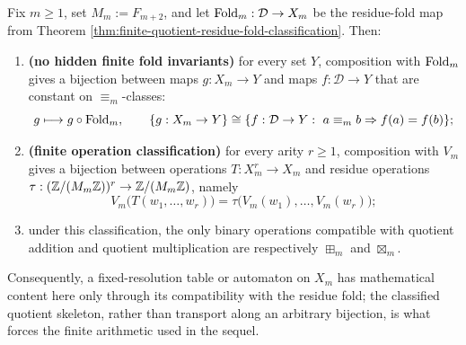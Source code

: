 \begin{theorem}\label{thm:residue-fold-factorization-rigidity}
Fix \(m\ge1\), set \(M_m:=F_{m+2}\), and let \(\operatorname{Fold}_m:\mathcal D\to X_m\) be the residue-fold map from Theorem \ref{thm:finite-quotient-residue-fold-classification}. Then:
\begin{enumerate}
  \item \textbf{(no hidden finite fold invariants)} for every set \(Y\), composition with \(\operatorname{Fold}_m\) gives a bijection between maps \(g:X_m\to Y\) and maps \(f:\mathcal D\to Y\) that are constant on \(\equiv_m\)-classes:
\[
g\longmapsto g\circ\operatorname{Fold}_m,
\qquad
\{g:X_m\to Y\}\cong\{f:\mathcal D\to Y:\ a\equiv_m b\Rightarrow f(a)=f(b)\};
\]
  \item \textbf{(finite operation classification)} for every arity \(r\ge1\), composition with \(V_m\) gives a bijection between operations \(T:X_m^r\to X_m\) and residue operations \(\tau:(\mathbb{Z}/(M_m\mathbb{Z}))^r\to\mathbb{Z}/(M_m\mathbb{Z})\), namely
\[
V_m\bigl(T(w_1,\dots,w_r)\bigr)
=\tau\bigl(V_m(w_1),\dots,V_m(w_r)\bigr);
\]
  \item under this classification, the only binary operations compatible with quotient addition and quotient multiplication are respectively \(\boxplus_m\) and \(\boxtimes_m\).
\end{enumerate}
Consequently, a fixed-resolution table or automaton on \(X_m\) has mathematical content here only through its compatibility with the residue fold; the classified quotient skeleton, rather than transport along an arbitrary bijection, is what forces the finite arithmetic used in the sequel.
\end{theorem}

